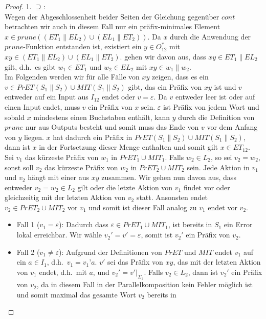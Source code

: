 \begin{proof}
  1. \glqq $\supseteq$\grqq :\\
  Wegen der Abgeschlossenheit beider Seiten der Gleichung gegenüber $cont$
  betrachten wir auch in diesem Fall nur ein präfix-minimales Element $x\in
  prune((ET_1\|EL_2)\cup (EL_1\|ET_2))$. Da $x$ durch die Anwendung der
  $prune$-Funktion entstanden ist, existiert ein $y\in O_{12}^*$ mit
  $xy\in(ET_1\|EL_2)\cup (EL_1\|ET_2)$. \OBdA{} gehen wir davon aus, dass
  $xy\in ET_1\|EL_2$ gilt, d.h.\ es gibt $w_1\in ET_1$ und $w_2\in EL_2$ mit
  $xy\in w_1\|w_2$.\\
  Im Folgenden werden wir für alle Fälle von $xy$ zeigen, dass es ein $v\in
  PrET(S_1\|S_2)\cup MIT(S_1\|S_2)$ gibt, das ein Präfix von $xy$ ist und $v$
  entweder auf ein Input aus $I_{12}$ endet oder $v = \varepsilon$. Da $v$
  entweder leer ist oder auf einen Input endet, muss $v$ ein Präfix von $x$
  sein. $\varepsilon$ ist Präfix von jedem Wort und sobald $x$ mindestens einen
  Buchstaben enthält, kann $y$ durch die Definition von $prune$ nur aus Outputs
  besteht und somit muss das Ende von $v$ vor dem Anfang von $y$ liegen. $x$
  hat dadurch ein Präfix in $PrET(S_1\|S_2)\cup MIT(S_1\|S_2)$, dann ist $x$ in
  der Fortsetzung dieser Menge enthalten und somit gilt $x\in ET_{12}$.\\
  Sei $v_1$ das kürzeste Präfix von $w_1$ in $PrET_1\cup MIT_1$. Falls
  $w_2\in L_2$, so sei $v_2=w_2$, sonst soll $v_2$ das kürzeste Präfix von
  $w_2$ in $PrET_2\cup MIT_2$ sein. Jede Aktion in $v_1$ und $v_2$ hängt mit
  einer aus $xy$ zusammen. Wir gehen nun davon aus, dass entweder
  $v_2=w_2\in L_2$ gilt oder die letzte Aktion von $v_1$ findet vor oder
  gleichzeitig mit der letzten Aktion von $v_2$ statt. Ansonsten endet
  $v_2\in PrET_2\cup MIT_2$ vor $v_1$ und somit ist dieser Fall analog zu $v_1$
  endet vor $v_2$.
  \begin{itemize}
    \item Fall 1 ($v_1=\varepsilon$): Dadurch dass $\varepsilon\in PrET_1\cup
      MIT_1$, ist bereits in $S_1$ ein Error lokal erreichbar. Wir wähle
      $v_2'=v'=\varepsilon$, somit ist $v_2'$ ein Präfix von $v_2$.
    \item Fall 2 ($v_1\neq\varepsilon$): Aufgrund der Definitionen von $PrET$
      und $MIT$ endet $v_1$ auf ein $a\in I_1$, d.h.\ $v_1=v_1’a$. $v'$ sei das
      Präfix von $xy$, das mit der letzten Aktion von $v_1$ endet, d.h.\ mit
      $a$, und $v_2'=v'|_{\Sigma _{2}}$. Falls $v_2\in L_2$, dann ist
      $v_2'$ ein Präfix von $v_2$, da in diesem Fall in der
      Parallelkomposition kein Fehler möglich ist und somit maximal das gesamte Wort $v_2$ bereits in

\end{itemize}
\end{proof}
